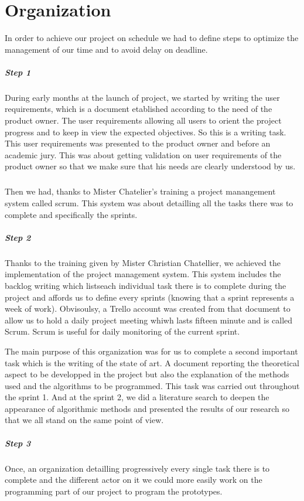 \chapter{Organization}

In order to achieve our project on schedule we had to define steps to optimize the management of our time and to avoid delay on deadline.
\paragraph{Step 1}
During early months at the launch of project, we started by writing the user requirements, which is a document etablished according to the need of the product owner. The user requirements allowing all users to orient the project progress and to keep in view the expected objectives. So this is a writing task. This  user requirements was presented to the product owner and before an academic jury.
This was about getting validation on user requirements of the product owner so that we make sure that his needs are clearly understood by us.
\paragraph{}
Then we had, thanks to Mister Chatelier's training a project manangement system called scrum. This system was about detailling all the tasks there was to complete and specifically the sprints.


\paragraph{Step 2}

Thanks to the training given by Mister Christian Chatellier, we achieved the implementation of the project management system. This system includes the backlog writing which listseach individual task there is to complete during the project and affords us to define every sprints (knowing that a sprint represents a week of work). Obvisoulsy, a Trello account was created from that document to allow us to hold a daily project meeting whiwh lasts fifteen minute and is called Scrum. Scrum is useful for daily monitoring of the current sprint.

The main purpose of this organization was for us to complete a second important task which is the writing of the state of art. A document reporting the theoretical aspect to be developped in the project but also the explanation of the methods used and the algorithms to be programmed. This task was carried out throughout the sprint 1.
And at the sprint 2, we did a literature search to deepen the appearance of algorithmic methods and presented the results of our research so that we all stand on the same point of view.

\paragraph{Step 3}
Once, an organization detailling progressively every single task there is to complete and the different actor on it we could more easily work on the programming part of our project to program the prototypes.